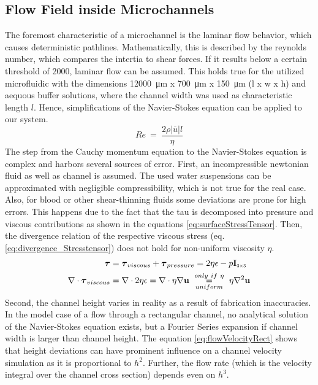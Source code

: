 \subsection{Flow Field inside Microchannels}
The foremost characteristic of a microchannel is the laminar flow behavior, which causes deterministic pathlines. Mathematically, this is described by the reynolds number, which compares the intertia to shear forces. If it results below a certain threshold of 2000, laminar flow can be assumed. This holds true for the utilized microfluidic with the dimensions \SI{12000}{\micro\meter} x \SI{700}{\micro\meter} x \SI{150}{\micro\meter} (l x w x h) and aequous buffer solutions, where the channel width was used as characteristic length $l$. Hence, simplifications of the Navier-Stokes equation can be applied to our system. 
\begin{equation}
	\mathit{Re}\ =\ \frac{2 \rho |\overline{u}| l }{\eta}
\end{equation}
The step from the Cauchy momentum equation to the Navier-Stokes equation is complex and harbors several sources of error. First, an incompressible newtonian fluid as well as channel is assumed. The used water suspensions can be approximated with negligible compressibility, which is not true for the real case. Also, for blood or other shear-thinning fluids some deviations are prone for high errors. This happens due to the fact that the \gls{tau} is decomposed into pressure and viscous contributions as shown in the equations \ref{eq:surfaceStressTensor}. Then, the divergence relation  of the respective viscous stress (eq. \ref{eq:divergence_Stresstensor}) does not hold for non-uniform viscosity $\eta$.
\begin{align}
	\boldsymbol{\tau} &= \boldsymbol{\tau}_{viscous} +  \boldsymbol{\tau}_{pressure} = 2\eta\epsilon - p \mathbf{I}_{\scaleto{3 \times 3}{4pt}} \label{eq:surfaceStressTensor}\\
	\nabla \cdot \boldsymbol{\tau}_{viscous} &= \nabla \cdot 2\eta\epsilon = \nabla \cdot \eta \nabla \mathbf{u} \ \underset{uniform}{\overset{only \ if \ \eta}{=}} \ \eta \nabla^2 \mathbf{u} 	\label{eq:divergence_Stresstensor}
\end{align}
Second, the channel height varies in reality as a result of fabrication inaccuracies. In the model case of a flow through a rectangular channel, no analytical solution of the Navier-Stokes equation exists, but a Fourier Series expansion if channel width is larger than channel height. \cite{lit:fluidic:bruus} The equation \ref{eq:flowVelocityRect} shows that height deviations can have prominent influence on a channel velocity simulation as it is proportional to $h^2$. Further, the flow rate (which is the velocity integral over the channel cross section) depends even on $h^3$. 
